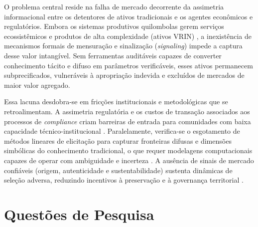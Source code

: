 O problema central reside na falha de mercado decorrente da assimetria informacional entre os detentores de ativos tradicionais e os agentes econômicos e regulatórios. Embora os sistemas produtivos quilombolas gerem serviços ecossistêmicos e produtos de alta complexidade (ativos VRIN) \cite{Barney1991}, a inexistência de mecanismos formais de mensuração e sinalização (\textit{signaling}) impede a captura desse valor intangível. Sem ferramentas auditáveis capazes de converter conhecimento tácito e difuso em parâmetros verificáveis, esses ativos permanecem subprecificados, vulneráveis à apropriação indevida e excluídos de mercados de maior valor agregado.

Essa lacuna desdobra-se em fricções institucionais e metodológicas que se retroalimentam. A assimetria regulatória e os custos de transação associados aos processos de \textit{compliance} criam barreiras de entrada para comunidades com baixa capacidade técnico-institucional \cite{Agrawal2002}. Paralelamente, verifica-se o esgotamento de métodos lineares de elicitação para capturar fronteiras difusas e dimensões simbólicas do conhecimento tradicional, o que requer modelagens computacionais capazes de operar com ambiguidade e incerteza \cite{Zadeh1965}. A ausência de sinais de mercado confiáveis (origem, autenticidade e sustentabilidade) sustenta dinâmicas de seleção adversa, reduzindo incentivos à preservação e à governança territorial \cite{Belletti2015}.


\section{Questões de Pesquisa}

